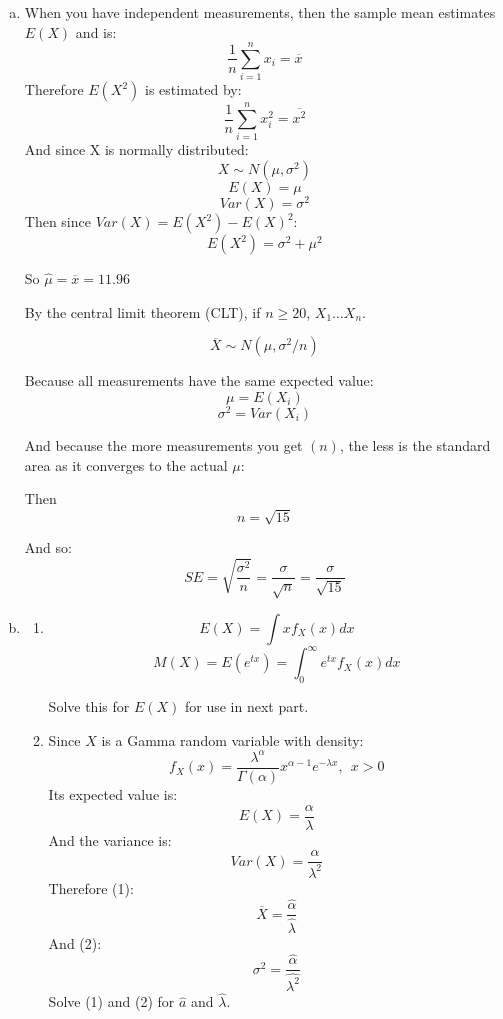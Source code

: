 \documentclass[11pt]{extarticle}
\begin{document}
\begin{enumerate}[(a)]

\item When you have independent measurements, then the sample mean estimates $E(X)$ and is: $$\frac{1}{n} \sum_{i=1}^{n} x_i = \overline{x}$$
Therefore $E(X^2)$ is estimated by: $$\frac{1}{n} \sum_{i=1}^{n} x_i^2 = \overline{x^2}$$
And since X is normally distributed:$$X \sim N(\mu, \sigma^2)$$ $$E(X) = \mu$$ $$Var(X) = \sigma^2$$
Then since $Var(X) = E(X^2) - E(X)^2$:
 $$E(X^2) = \sigma^2 + \mu^2$$


So $\boxed{ \hat{\mu} = \overline{x} = 11.96 }$

By the central limit theorem (CLT), if $n \geq 20$, $X_1 \dots X_n$. 

$$\overline{X} \sim N(\mu, \sigma^2/n)$$

Because all measurements have the same expected value:$$\mu = E(X_i)$$ $$\sigma^2 = Var(X_i)$$

And because the more measurements you get $(n)$, the less is the standard area as it converges to the actual $\mu$: 

Then $$n = \sqrt{15} $$

And so: $$SE = \sqrt{ \frac{\sigma^2}{n}} = \frac{\sigma}{\sqrt{n}} = \frac{\sigma}{\sqrt{15}}$$


\item \begin{enumerate}[b1)]

\item 
$$E(X) = \int xf_X(x) dx $$ %
$$M(X) = E(e^{tx}) = \int_0^{\infty} e^{tx} f_X(x) dx$$

Solve this for $E(X)$ for use in next part.
\item  Since $X$ is a Gamma random variable with density: $$f_X(x) = \frac{\lambda^\alpha}{\Gamma(\alpha)} x^{\alpha -1 } e^{-\lambda x}, \ \ x > 0 $$
Its expected value is: $$E(X) = \frac{\alpha}{\lambda}$$ And the variance is: $$Var(X) = \frac{\alpha}{\lambda^2}$$ Therefore (1): $$\overline{X} = \frac{\hat{\alpha}}{\hat{\lambda}}$$ And (2): $$ \sigma^2 = \frac{\hat{\alpha}}{\hat{\lambda^2}} $$ Solve (1) and (2) for $\hat{a}$ and $\hat{\lambda}$.



\end{enumerate}








\end{enumerate}
\end{document}
